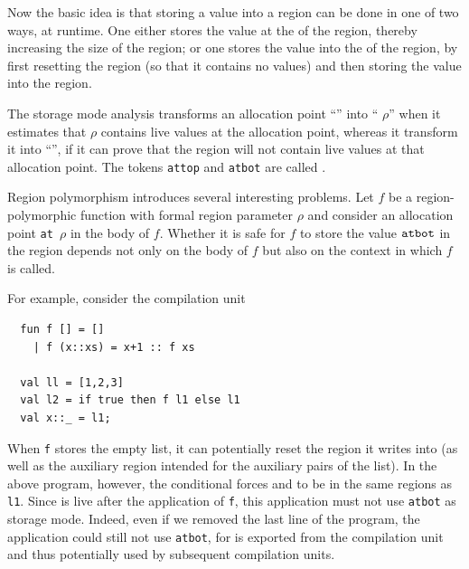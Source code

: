 \documentclass[12pt]{book}
\begin{document}
Now the basic idea is that storing a value into a region can be done
in one of two ways, at runtime. One either stores the value at the 
of the region, thereby increasing the size of the region; or one stores
the value into the  of the region, by first resetting the region
(so that it contains no values) and then storing the value into the region.

The storage mode analysis transforms an allocation point ``'' into `` $\rho$'' when it  estimates that
$\rho$ contains live values at the allocation point, whereas it
transform it into ``'', if it can prove that the
region will not contain live values at that allocation point. The
tokens {\tt attop} and {\tt atbot} are called .

Region polymorphism introduces several interesting problems. Let $f$ be
a region-polymorphic function with formal region parameter $\rho$ and
consider an allocation point {\tt at $\rho$} in the body of $f$.
Whether it is safe for $f$ to store the value $\hbox{\tt atbot}$ in the region
depends not only on the body of $f$ but also on the context in which
$f$ is called.

For example, consider the compilation unit
\begin{verbatim}
  fun f [] = []
    | f (x::xs) = x+1 :: f xs

  val ll = [1,2,3]
  val l2 = if true then f l1 else l1
  val x::_ = l1;
\end{verbatim}
When {\tt f} stores the empty list, it can potentially reset the
region it writes into (as well as the auxiliary region intended for
the auxiliary pairs of the list). In the above program, however,
the conditional forces  and  
to be in the same regions as {\tt l1}.
Since  is live after the application of {\tt f}, this application
must not use {\tt atbot} as storage mode. Indeed, even if we removed the
last line of the program, the application could still not use {\tt atbot}, 
for  is exported from the compilation unit and thus potentially 
used by subsequent compilation units.
\end{document}
